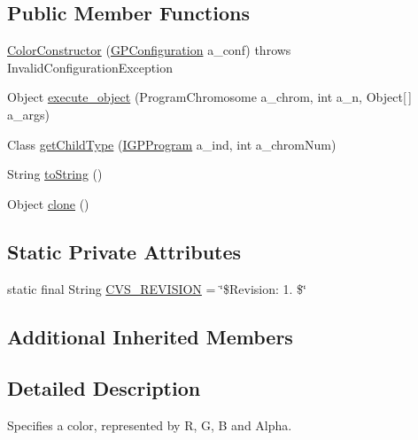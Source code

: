 \subsection*{Public Member Functions}
\begin{DoxyCompactItemize}
\item 
\hyperlink{classexamples_1_1gp_1_1monalisa_1_1core_1_1commands_1_1_color_constructor_acf43ad8ae30ac4e40f5b5c85070ef0b4}{Color\-Constructor} (\hyperlink{classorg_1_1jgap_1_1gp_1_1impl_1_1_g_p_configuration}{G\-P\-Configuration} a\-\_\-conf)  throws Invalid\-Configuration\-Exception 
\item 
Object \hyperlink{classexamples_1_1gp_1_1monalisa_1_1core_1_1commands_1_1_color_constructor_a841b49485b96c42b59afdcb8e6e5451c}{execute\-\_\-object} (Program\-Chromosome a\-\_\-chrom, int a\-\_\-n, Object\mbox{[}$\,$\mbox{]} a\-\_\-args)
\item 
Class \hyperlink{classexamples_1_1gp_1_1monalisa_1_1core_1_1commands_1_1_color_constructor_af4ce9fe0a23dc423c538650b247043d4}{get\-Child\-Type} (\hyperlink{interfaceorg_1_1jgap_1_1gp_1_1_i_g_p_program}{I\-G\-P\-Program} a\-\_\-ind, int a\-\_\-chrom\-Num)
\item 
String \hyperlink{classexamples_1_1gp_1_1monalisa_1_1core_1_1commands_1_1_color_constructor_a194e21a034ed81cd359fb9dbe1afc4c3}{to\-String} ()
\item 
Object \hyperlink{classexamples_1_1gp_1_1monalisa_1_1core_1_1commands_1_1_color_constructor_a81b90e0292c645f624b7f0c0b6f2a70b}{clone} ()
\end{DoxyCompactItemize}
\subsection*{Static Private Attributes}
\begin{DoxyCompactItemize}
\item 
static final String \hyperlink{classexamples_1_1gp_1_1monalisa_1_1core_1_1commands_1_1_color_constructor_acc7472a767fcea41aad7df0481cff40b}{C\-V\-S\-\_\-\-R\-E\-V\-I\-S\-I\-O\-N} = \char`\"{}\$Revision\-: 1. \$\char`\"{}
\end{DoxyCompactItemize}
\subsection*{Additional Inherited Members}


\subsection{Detailed Description}
Specifies a color, represented by R, G, B and Alpha.

